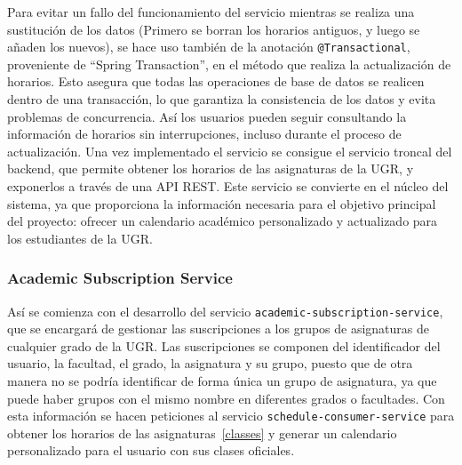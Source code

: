 \newline
Para evitar un fallo del funcionamiento del servicio mientras se realiza una sustitución de los datos (Primero se borran los horarios antiguos, y luego se añaden los nuevos), se hace uso también de la anotación \texttt{@Transactional}, proveniente de ``Spring Transaction'', en el método que realiza la actualización de horarios. Esto asegura que todas las operaciones de base de datos se realicen dentro de una transacción, lo que garantiza la consistencia de los datos y evita problemas de concurrencia. Así los usuarios pueden seguir consultando la información de horarios sin  interrupciones, incluso durante el proceso de actualización.
\newline\newline
Una vez implementado el servicio se consigue el servicio troncal del backend, que permite obtener los horarios de las asignaturas de la UGR, y exponerlos a través de una API REST. Este servicio se convierte en el núcleo del sistema, ya que proporciona la información necesaria para el objetivo principal del proyecto: ofrecer un calendario académico personalizado y actualizado para los estudiantes de la UGR.

\subsubsection{Academic Subscription Service}
Así se comienza con el desarrollo del servicio \texttt{academic-subscription-service}, que se encargará de gestionar las suscripciones a los grupos de asignaturas de cualquier grado de la UGR.\newline
Las suscripciones se componen del identificador del usuario, la facultad, el grado, la asignatura y su grupo, puesto que de otra manera no se podría identificar de forma única un grupo de asignatura, ya que puede haber grupos con el mismo nombre en diferentes grados o facultades. Con esta información se hacen peticiones al servicio \texttt{schedule-consumer-service} para obtener los horarios de las asignaturas~\ref{classes} y generar un calendario personalizado para el usuario con sus clases oficiales.\newline

